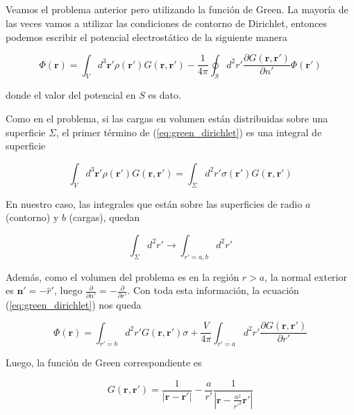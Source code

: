 \subsection{}
Veamos el problema anterior pero utilizando la funci\'on de Green. La mayoría de las veces vamos a utilizar las condiciones de contorno de Dirichlet, entonces podemos escribir el potencial electrost\'atico de la siguiente manera

\begin{equation}
    \label{eq:green_dirichlet}
    \Phi(\mathbf{r}) = \int_{V}d^{3}\mathbf{r}'\rho(\mathbf{r}')G(\mathbf{r}, \mathbf{r}') - \frac{1}{4\pi}\oint_{S}d^{2}r'\frac{\partial G(\mathbf{r}, \mathbf{r}')}{\partial n'}\Phi(\mathbf{r}')
\end{equation}

donde el valor del potencial en $S$ es dato.\newline

Como en el problema, si las cargas en volumen est\'an distribuidas sobre una superficie $\Sigma$, el primer t\'ermino de (\ref{eq:green_dirichlet}) es una integral de superficie

$$\int_{V}d^{3}\mathbf{r}'\rho(\mathbf{r}')G(\mathbf{r}, \mathbf{r}') = \int_{\Sigma}d^{2}r'\sigma(\mathbf{r}')G(\mathbf{r}, \mathbf{r}')$$

En nuestro caso, las integrales que est\'an sobre las superficies de radio $a$ (contorno) y $b$ (cargas), quedan

$$\int_{\Sigma}d^{2}r' \rightarrow \int_{r' = a, b}d^{2}r'$$

Adem\'as, como el volumen del problema es en la regi\'on $r > a$, la normal exterior es $\mathbf{n}' = -\hat{r}'$, luego $\frac{\partial}{\partial n'} = -\frac{\partial}{\partial r'}$. Con toda esta informaci\'on, la ecuaci\'on (\ref{eq:green_dirichlet}) nos queda

\begin{equation}
    \label{eq:green1}
    \Phi(\mathbf{r}) = \int_{r' = b}d^{2}r'G(\mathbf{r}, \mathbf{r}')\sigma + \frac{V}{4\pi}\int_{r' = a}d^{2}r'\frac{\partial G(\mathbf{r}, \mathbf{r}')}{\partial r'}
\end{equation}

Luego, la funci\'on de Green correspondiente es

\begin{equation}
    \label{eq:green2}
    G(\mathbf{r}, \mathbf{r}') = \frac{1}{|\mathbf{r} - \mathbf{r}'|} - \frac{a}{r'}\frac{1}{|\mathbf{r} - \frac{a^{2}}{r'^{2}}\mathbf{r}'|}
\end{equation}


